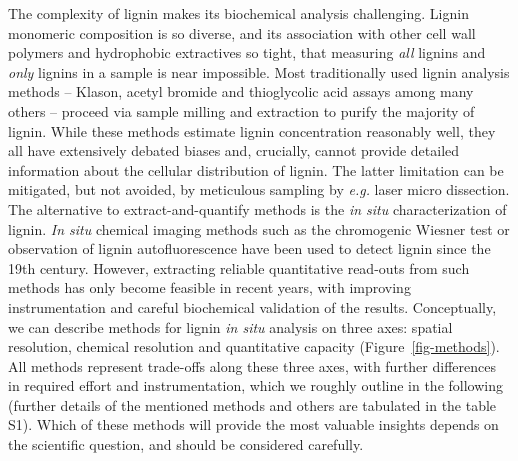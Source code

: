 \documentclass[journal=,manuscript=]{achemso}
\begin{document}
The complexity of lignin makes its biochemical analysis challenging.
Lignin monomeric composition is so diverse, and its association with
other cell wall polymers and hydrophobic extractives so tight, that
measuring \emph{all} lignins and \emph{only} lignins in a sample is near
impossible. Most traditionally used lignin analysis methods -- Klason,
acetyl bromide and thioglycolic acid assays among many others -- proceed
via sample milling and extraction to purify the majority of lignin.
While these methods estimate lignin concentration reasonably well, they
all have extensively debated biases\citep{Hatfield2005} and, crucially,
cannot provide detailed information about the cellular distribution of
lignin. The latter limitation can be mitigated, but not avoided, by
meticulous sampling by \emph{e.g.} laser micro dissection. The
alternative to extract-and-quantify methods is the \emph{in situ}
characterization of lignin. \emph{In situ} chemical imaging methods such
as the chromogenic Wiesner test or observation of lignin
autofluorescence have been used to detect lignin since the 19th century.
However, extracting reliable quantitative read-outs from such methods
has only become feasible in recent years, with improving instrumentation
and careful biochemical validation of the results. Conceptually, we can
describe methods for lignin \emph{in situ} analysis on three axes:
spatial resolution, chemical resolution and quantitative capacity
(Figure~\ref{fig-methods}). All methods represent trade-offs along these
three axes, with further differences in required effort and
instrumentation, which we roughly outline in the following (further
details of the mentioned methods and others are tabulated in the table
S1). Which of these methods will provide the most valuable insights
depends on the scientific question, and should be considered carefully.
\end{document}
